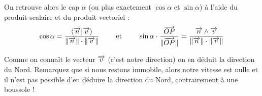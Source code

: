 \documentclass[class=report,crop=false]{standalone}
\begin{document}
 

On retrouve alors le cap $\alpha$ (ou plus exactement $\cos \alpha$ et $\sin \alpha$) 
à l'aide du produit scalaire et du produit vectoriel :
$$\cos \alpha  = \frac{\langle \overrightarrow n | \overrightarrow v\rangle}{\| \overrightarrow n \| \cdot \| \overrightarrow v \|}
\qquad \text{ et } \qquad
\sin \alpha \cdot \frac{\overrightarrow{OP}}{\|\overrightarrow{OP} \|} = \frac{ \overrightarrow n \wedge \overrightarrow v}{\| \overrightarrow n \| \cdot \| \overrightarrow v \|}
$$

Comme on connaît le vecteur $\overrightarrow v$ (c'est notre direction) on en déduit la direction du Nord.
Remarquez que si nous restons immobile, alors notre vitesse est nulle et il n'est pas possible
d'en déduire la direction du Nord, contrairement à une boussole !




\end{document}
